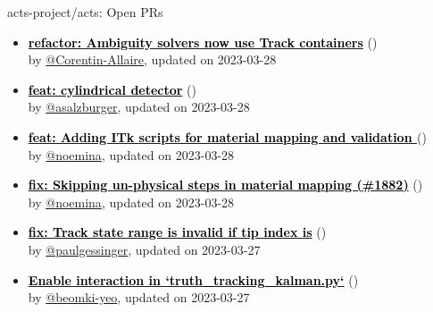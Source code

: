 \begin{frame}[allowframebreaks]{ acts-project/acts: Open PRs
}

  \begin{itemize}
    
    
    \item\iss\textbf{\href{https://github.com/acts-project/acts/pull/1996}{\textcolor{black}{refactor: Ambiguity solvers now use Track containers}}}
    (\href{https://github.com/acts-project/acts/pull/1996}{}) \\
    by \href{https://github.com/Corentin-Allaire}{@Corentin-Allaire}, updated on 2023-03-28

    \item\iss\textbf{\href{https://github.com/acts-project/acts/pull/1983}{\textcolor{black}{feat: cylindrical detector}}}
    (\href{https://github.com/acts-project/acts/pull/1983}{}) \\
    by \href{https://github.com/asalzburger}{@asalzburger}, updated on 2023-03-28

    \item\iss\textbf{\href{https://github.com/acts-project/acts/pull/1967}{\textcolor{black}{feat: Adding ITk scripts for material mapping and validation }}}
    (\href{https://github.com/acts-project/acts/pull/1967}{}) \\
    by \href{https://github.com/noemina}{@noemina}, updated on 2023-03-28

    \item\iss\textbf{\href{https://github.com/acts-project/acts/pull/1968}{\textcolor{black}{fix: Skipping un-physical steps in material mapping (\#1882)}}}
    (\href{https://github.com/acts-project/acts/pull/1968}{}) \\
    by \href{https://github.com/noemina}{@noemina}, updated on 2023-03-28

    \item\iss\textbf{\href{https://github.com/acts-project/acts/pull/1995}{\textcolor{black}{fix: Track state range is invalid if tip index is}}}
    (\href{https://github.com/acts-project/acts/pull/1995}{}) \\
    by \href{https://github.com/paulgessinger}{@paulgessinger}, updated on 2023-03-27

    \item\iss\textbf{\href{https://github.com/acts-project/acts/pull/1990}{\textcolor{black}{Enable interaction in `truth\_tracking\_kalman.py`}}}
    (\href{https://github.com/acts-project/acts/pull/1990}{}) \\
    by \href{https://github.com/beomki-yeo}{@beomki-yeo}, updated on 2023-03-27


\end{itemize}
\end{frame}
